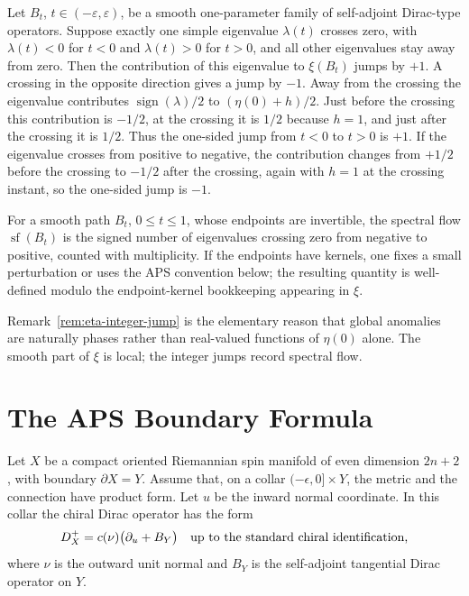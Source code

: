 \begin{remark}
\label{rem:eta-integer-jump}
Let \(B_t\), \(t\in(-\varepsilon,\varepsilon)\), be a smooth one-parameter
family of self-adjoint Dirac-type operators.  Suppose exactly one simple
eigenvalue \(\lambda(t)\) crosses zero, with
\(\lambda(t)<0\) for \(t<0\) and \(\lambda(t)>0\) for \(t>0\), and all other
eigenvalues stay away from zero.  Then the contribution of this eigenvalue to
\(\xi(B_t)\) jumps by \(+1\).  A crossing in the opposite direction gives a
jump by \(-1\).
Away from the crossing the eigenvalue contributes
\(\operatorname{sign}(\lambda)/2\) to
\((\eta(0)+h)/2\).  Just before the crossing this contribution is
\(-1/2\), at the crossing it is \(1/2\) because \(h=1\), and just after the
crossing it is \(1/2\).  Thus the one-sided jump from \(t<0\) to \(t>0\) is
\(+1\).  If the eigenvalue crosses from positive to negative, the
contribution changes from \(+1/2\) before the crossing to \(-1/2\) after the
crossing, again with \(h=1\) at the crossing instant, so the one-sided jump is
\(-1\).
\end{remark}

\begin{definition}
For a smooth path \(B_t\), \(0\leq t\leq1\), whose endpoints are invertible,
the spectral flow \(\operatorname{sf}(B_t)\) is the signed number of
eigenvalues crossing zero from negative to positive, counted with
multiplicity.  If the endpoints have kernels, one fixes a small perturbation
or uses the APS convention below; the resulting quantity is well-defined
modulo the endpoint-kernel bookkeeping appearing in \(\xi\).
\end{definition}

Remark~\ref{rem:eta-integer-jump} is the elementary reason that global
anomalies are naturally phases rather than real-valued functions of
\(\eta(0)\) alone.  The smooth part of \(\xi\) is local; the integer jumps
record spectral flow.

\section{The APS Boundary Formula}

Let \(X\) be a compact oriented Riemannian spin manifold of even dimension
\(2n+2\), with boundary \(\partial X=Y\).  Assume that, on a collar
\((-\epsilon,0]\times Y\), the metric and the connection have product form.
Let \(u\) be the inward normal coordinate.  In this collar the chiral Dirac
operator has the form
\begin{equation}
  D_X^+
  =
  c(\nu)\bigl(\partial_u+B_Y\bigr)
  \quad\hbox{up to the standard chiral identification,}
  \label{eq:aps-collar-dirac-form}
\end{equation}
where \(\nu\) is the outward unit normal and \(B_Y\) is the self-adjoint
tangential Dirac operator on \(Y\).

